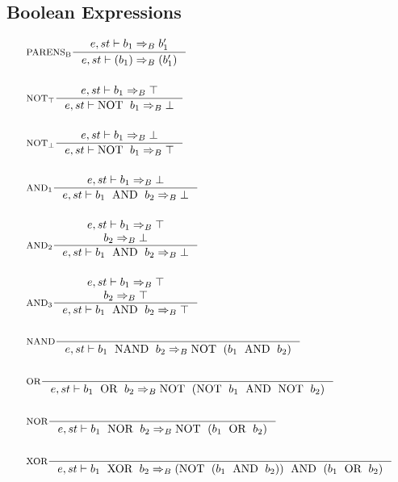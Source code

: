 \subsection{Boolean Expressions}
\newcommand{\Tand}{\text{\; AND \;}}
\newcommand{\Tnot}{\text{NOT \;}}
\newcommand{\Tnand}{\text{\; NAND \;}}
\newcommand{\Tor}{\text{\; OR \;}} 
\newcommand{\Tnor}{\text{\; NOR \;}}
\newcommand{\Txor}{\text{\; XOR \;}}

\begin{align*}
&\inference[$\text{PARENS}_\text{B}$]{e,st \vdash b_1 \Rightarrow_B b_1'}
                       {e,st \vdash (b_1) \Rightarrow_B (b_1')}
\\\\
&\inference[$\text{NOT}_\top$]{e,st \vdash b_1 \Rightarrow_B \top}
                       {e,st \vdash \Tnot b_1 \Rightarrow_B \bot}
\\\\
&\inference[$\text{NOT}_\bot$]{e,st \vdash b_1 \Rightarrow_B \bot}
                       {e,st \vdash \Tnot b_1 \Rightarrow_B \top}
\\\\
&\inference[$\text{AND}_1$]{e,st \vdash b_1 \Rightarrow_B \bot}
                    {e,st \vdash b_1 \Tand b_2 \Rightarrow_B \bot}
\\\\
&\inference[$\text{AND}_2$]{e,st \vdash b_1 \Rightarrow_B \top \\ b_2 \Rightarrow_B \bot}
								    {e,st \vdash b_1 \Tand b_2 \Rightarrow_B \bot}
\\\\
&\inference[$\text{AND}_3$]{e,st \vdash b_1 \Rightarrow_B \top \\ b_2 \Rightarrow_B \top}
								    {e,st \vdash b_1 \Tand b_2 \Rightarrow_B \top}
\\\\
&\inference[NAND]{}
								   {e,st \vdash b_1 \Tnand b_2 \Rightarrow_B \Tnot( b_1 \Tand b_2 )}
\\\\
&\inference[OR]{}
                 {e,st \vdash b_1 \Tor b_2 \Rightarrow_B \Tnot(\Tnot b_1 \Tand \Tnot b_2)}
\\\\
&\inference[NOR]{}
								   {e,st \vdash b_1 \Tnor b_2 \Rightarrow_B \Tnot( b_1 \Tor b_2 )}
\\\\
&\inference[XOR]{}
                  {e,st \vdash b_1 \Txor b_2 \Rightarrow_B (\Tnot(b_1 \Tand b_2)) \Tand (b_1 \Tor b_2)}
\end{align*}

